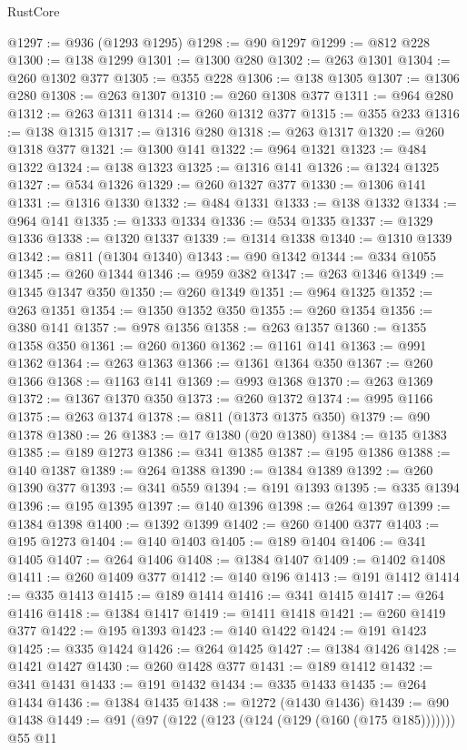 \begin{lexlean}{RustCore}
\begin{coremodule}
@1297 := @936 (@1293 @1295)
@1298 := @90 @1297
@1299 := @812 @228
@1300 := @138 @1299
@1301 := @1300 @280
@1302 := @263 @1301
@1304 := @260 @1302 @377
@1305 := @355 @228
@1306 := @138 @1305
@1307 := @1306 @280
@1308 := @263 @1307
@1310 := @260 @1308 @377
@1311 := @964 @280
@1312 := @263 @1311
@1314 := @260 @1312 @377
@1315 := @355 @233
@1316 := @138 @1315
@1317 := @1316 @280
@1318 := @263 @1317
@1320 := @260 @1318 @377
@1321 := @1300 @141
@1322 := @964 @1321
@1323 := @484 @1322
@1324 := @138 @1323
@1325 := @1316 @141
@1326 := @1324 @1325
@1327 := @534 @1326
@1329 := @260 @1327 @377
@1330 := @1306 @141
@1331 := @1316 @1330
@1332 := @484 @1331
@1333 := @138 @1332
@1334 := @964 @141
@1335 := @1333 @1334
@1336 := @534 @1335
@1337 := @1329 @1336
@1338 := @1320 @1337
@1339 := @1314 @1338
@1340 := @1310 @1339
@1342 := @811 (@1304 @1340)
@1343 := @90 @1342
@1344 := @334 @1055
@1345 := @260 @1344
@1346 := @959 @382
@1347 := @263 @1346
@1349 := @1345 @1347 @350
@1350 := @260 @1349
@1351 := @964 @1325
@1352 := @263 @1351
@1354 := @1350 @1352 @350
@1355 := @260 @1354
@1356 := @380 @141
@1357 := @978 @1356
@1358 := @263 @1357
@1360 := @1355 @1358 @350
@1361 := @260 @1360
@1362 := @1161 @141
@1363 := @991 @1362
@1364 := @263 @1363
@1366 := @1361 @1364 @350
@1367 := @260 @1366
@1368 := @1163 @141
@1369 := @993 @1368
@1370 := @263 @1369
@1372 := @1367 @1370 @350
@1373 := @260 @1372
@1374 := @995 @1166
@1375 := @263 @1374
@1378 := @811 (@1373 @1375 @350)
@1379 := @90 @1378
@1380 := 26
@1383 := @17 @1380 (@20 @1380)
@1384 := @135 @1383
@1385 := @189 @1273
@1386 := @341 @1385
@1387 := @195 @1386
@1388 := @140 @1387
@1389 := @264 @1388
@1390 := @1384 @1389
@1392 := @260 @1390 @377
@1393 := @341 @559
@1394 := @191 @1393
@1395 := @335 @1394
@1396 := @195 @1395
@1397 := @140 @1396
@1398 := @264 @1397
@1399 := @1384 @1398
@1400 := @1392 @1399
@1402 := @260 @1400 @377
@1403 := @195 @1273
@1404 := @140 @1403
@1405 := @189 @1404
@1406 := @341 @1405
@1407 := @264 @1406
@1408 := @1384 @1407
@1409 := @1402 @1408
@1411 := @260 @1409 @377
@1412 := @140 @196
@1413 := @191 @1412
@1414 := @335 @1413
@1415 := @189 @1414
@1416 := @341 @1415
@1417 := @264 @1416
@1418 := @1384 @1417
@1419 := @1411 @1418
@1421 := @260 @1419 @377
@1422 := @195 @1393
@1423 := @140 @1422
@1424 := @191 @1423
@1425 := @335 @1424
@1426 := @264 @1425
@1427 := @1384 @1426
@1428 := @1421 @1427
@1430 := @260 @1428 @377
@1431 := @189 @1412
@1432 := @341 @1431
@1433 := @191 @1432
@1434 := @335 @1433
@1435 := @264 @1434
@1436 := @1384 @1435
@1438 := @1272 (@1430 @1436)
@1439 := @90 @1438
@1449 := @91 (@97 (@122 (@123 (@124 (@129 (@160 (@175 @185))))))) @55 @11

\end{coremodule}
\end{lexlean}

